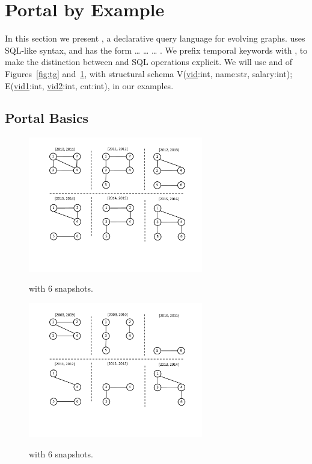 \section{Portal by Example}
\label{sec:example}

In this section we present \ql, a declarative query language for
evolving graphs. \ql uses SQL-like syntax, and has the form
 \ldots {} \ldots {} \ldots
{}.  We prefix temporal keywords with , to make
the distinction between \ql and SQL operations explicit.  We will use
\tgs {} and  of Figures~\ref{fig:tg}
and~\ref{fig:tg_t2}, with structural schema V(\underline{vid}:int,
name:str, salary:int); E(\underline{vid1}:int, \underline{vid2}:int,
cnt:int), in our examples.

\subsection{Portal Basics}
\label{sec:example:basics}

\begin{figure}[th!]
\centering
\begin{minipage}{3.3in}
  \centering
  \includegraphics[width=3in]{figs/6snaps.pdf}
  \caption{\tg {} with 6 snapshots.}{}
  \label{fig:tg}
\end{minipage}%
\begin{minipage}{3.3in}
  \centering
  \includegraphics[width=3in]{figs/t2.pdf}
  \caption{\tg {} with 6 snapshots.}{}
  \label{fig:tg_t2}
\end{minipage}
\end{figure}

